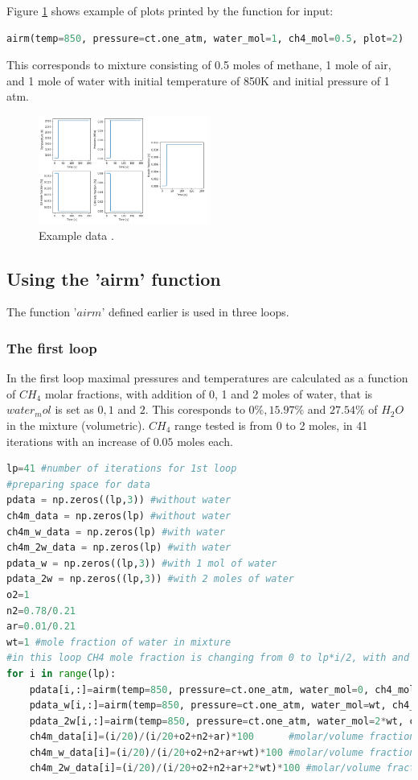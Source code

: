 \documentclass[a4paper]{article}
\begin{document}
Figure \ref{fig:example} shows example of plots printed by the function for input:
\begin{lstlisting}[language=python]
airm(temp=850, pressure=ct.one_atm, water_mol=1, ch4_mol=0.5, plot=2)
\end{lstlisting}
This corresponds  to mixture consisting of 0.5 moles of methane, 1 mole of air, and 1 mole of water with initial temperature of 850K and initial pressure of 1 atm.
\begin{figure}[h!]
\centering
\includegraphics[width=0.5\textwidth]{example_data.png}
\caption{\label{fig:example}Example data .}
\end{figure}

\subsection{Using the 'airm' function}
The function '$airm$' defined earlier is used in three loops.
\subsubsection{The first loop}
In the first loop maximal pressures and temperatures are calculated as a function of $CH_4$ molar fractions,  with addition of 0, 1 and 2 moles of water, that is $water_mol$ is set as $0, 1$ and $2$. This coresponds to $0\%, 15.97\%$ and $27.54\%$ of $H_2O$ in the mixture (volumetric). $CH_4$ range tested is from 0 to 2 moles, in 41 iterations with an increase of $0.05$ moles each.
\begin{lstlisting}[language=python]
lp=41 #number of iterations for 1st loop
#preparing space for data
pdata = np.zeros((lp,3)) #without water
ch4m_data = np.zeros(lp) #without water
ch4m_w_data = np.zeros(lp) #with water
ch4m_2w_data = np.zeros(lp) #with water
pdata_w = np.zeros((lp,3)) #with 1 mol of water
pdata_2w = np.zeros((lp,3)) #with 2 moles of water
o2=1 
n2=0.78/0.21
ar=0.01/0.21
wt=1 #mole fraction of water in mixture
#in this loop CH4 mole fraction is changing from 0 to lp*i/2, with and without addition of water
for i in range(lp):
    pdata[i,:]=airm(temp=850, pressure=ct.one_atm, water_mol=0, ch4_mol=i/2, plot=0) #without water
    pdata_w[i,:]=airm(temp=850, pressure=ct.one_atm, water_mol=wt, ch4_mol=i/2, plot=0) #with water
    pdata_2w[i,:]=airm(temp=850, pressure=ct.one_atm, water_mol=2*wt, ch4_mol=i/2, plot=0) #with water
    ch4m_data[i]=(i/20)/(i/20+o2+n2+ar)*100      #molar/volume fraction of CH4 in mixture, when there is no water
    ch4m_w_data[i]=(i/20)/(i/20+o2+n2+ar+wt)*100 #molar/volume fraction of CH4 in mixture, when there is 1 mole water
    ch4m_2w_data[i]=(i/20)/(i/20+o2+n2+ar+2*wt)*100 #molar/volume fraction of CH4 in mixture, when there are 2 moles of water
\end{lstlisting}
\end{document}
